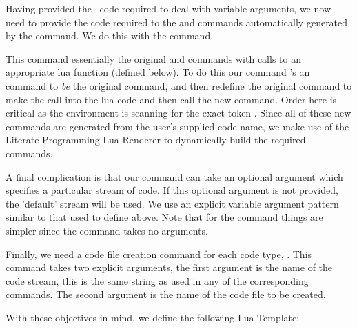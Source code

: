 \startConTest
\begingroup
\endgroup
\stopConTest
\stopTestCase

\stopTestSuite


Having provided the \ConTeXt\ code required to deal with variable 
arguments, we now need to provide the code required to  the 
\type{\startXXX} and \type{\stopXXX} commands automatically generated by 
the  command. We do this with the \type{\fixLitProgs} 
command. 

This command essentially  the original \type{\startXXX} and 
\type{\stopXXX} commands with calls to an appropriate lua function 
(defined below). To do this our  command \type{\let}'s an 
\type{\oldXXX} command to \emph{be} the original command, and then 
redefine the original command to make the call into the lua code and then 
call the new \type{\oldXXX} command. Order here is critical as the 
 environment is scanning for the exact token \type{\stopXXX}. 
Since all of these new commands are generated from the user's supplied 
code name, we make use of the Literate Programming Lua Renderer to 
dynamically build the required commands. 

A final complication is that our \type{\startXXX} command can take an 
optional argument which specifies a particular stream of code. If this 
optional argument is not provided, the 'default' stream will be used. We 
use an explicit variable argument pattern similar to that used to define 
 above. Note that for the \type{\stopXXX} command 
things are simpler since the \type{\stopXXX} command takes no arguments. 

Finally, we need a code file creation command for each code type, 
\type{\createXXXFile}. This command takes two explicit arguments, the 
first argument is the name of the code stream, this is the same string as 
used in any of the corresponding \type{\startXXX} commands. The second 
argument is the name of the code file to be created. 

With these objectives in mind, we define the following Lua Template:

